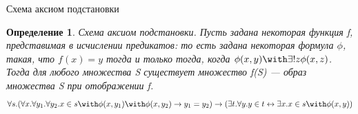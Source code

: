 \documentclass[aspectratio=169]{beamer}
\newtheorem{dfn}{Определение}[section]
\begin{document}
\begin{frame}{Схема аксиом подстановки}
\begin{dfn}Схема аксиом подстановки. 
Пусть задана некоторая функция f, представимая в исчислении предикатов:
то есть задана некоторая формула $\phi$, такая, что $f(x) = y$
тогда и только тогда, когда $\phi(x,y) \with \exists ! z \phi(x,z)$.
Тогда для любого множества S существует множество f(S) --- образ
множества S при отображении f.
$$\forall s .(\forall x .\forall y_1 .\forall y_2 .x \in s \with \phi (x,y_1) \with \phi
(x,y_2) \rightarrow y_1=y_2) \rightarrow 
(\exists t .\forall y .y \in t
\leftrightarrow \exists x . x \in s \with \phi (x,y)) $$
\end{dfn}
\end{frame}
\end{document}
